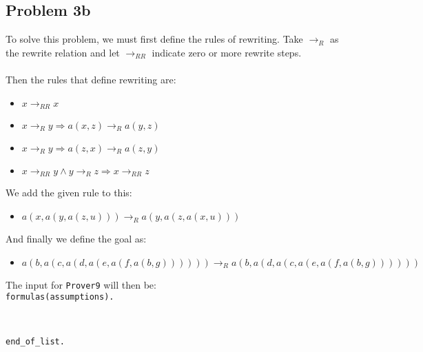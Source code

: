 \documentclass[a4paper]{article}
\begin{document}
{	\subsection*{Problem 3b}
	To solve this problem, we must first define the rules of rewriting. Take $\rightarrow_R$ as the rewrite relation and let $\rightarrow_{RR}$ indicate zero or more rewrite steps.\\
	\\
	Then the rules that define rewriting are:
	\begin{itemize}
		\item $x \rightarrow_{RR} x$
		\item $x \rightarrow_R y \Rightarrow a(x, z) \rightarrow_R a(y, z)$
		\item $x \rightarrow_R y \Rightarrow a(z, x) \rightarrow_R a(z, y)$
		\item $x \rightarrow_{RR} y \wedge y \rightarrow_{R} z \Rightarrow x \rightarrow_{RR} z$
	\end{itemize}
	We add the given rule to this:
	\begin{itemize}
		\item $a(x, a(y, a(z, u))) \rightarrow_{R} a(y, a(z, a(x, u)))$
	\end{itemize}
	And finally we define the goal as:
	\begin{itemize}
		\item $a(b, a(c, a(d, a(e, a(f, a(b, g)))))) \rightarrow_R a(b, a(d, a(c, a(e, a(f, a(b, g))))))$
		    
	\end{itemize}
	
	\noindent The input for {\tt Prover9} will then be:\\
	
	{\tt formulas(assumptions).}
	
	\indent {}
	
	\indent {}
	
	\indent {}
	
	\indent {}
	
	\indent {}\\
	
	\indent {}
	
	\indent {}
	
	{\tt end\_of\_list.}
	
}
\end{document}
